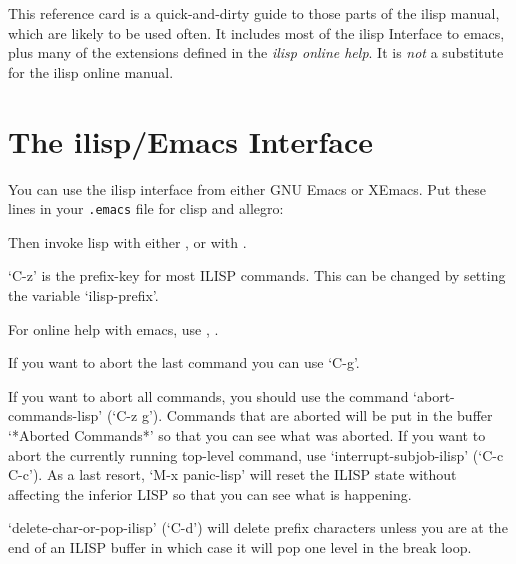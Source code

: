 This reference card is a quick-and-dirty guide to those parts of the
ilisp manual, which are likely to be used often.
It includes most of the ilisp Interface to emacs, plus many of the
extensions defined in the {\it ilisp online help}.  It is {\it not} a
substitute for the ilisp online manual.

\section{The ilisp/Emacs Interface }

You can use the ilisp interface from either GNU Emacs or XEmacs.  
Put these lines in your {\tt .emacs} file for clisp and allegro:


\hskip 25pt 
	 


\hskip 25pt 



\hskip 25pt 


Then invoke lisp with either , 
or with .

`C-z' is the prefix-key for most ILISP commands. This can be changed by 
setting the variable `ilisp-prefix'.

For online help with emacs, use , .


If you want to abort the last command you can use `C-g'.

If you want to abort all commands, you should use the command
`abort-commands-lisp' (`C-z g').  Commands that are aborted will be put
in the buffer `*Aborted Commands*' so that you can see what was
aborted.  If you want to abort the currently running top-level command,
use `interrupt-subjob-ilisp' (`C-c C-c').  As a last resort, `M-x
panic-lisp' will reset the ILISP state without affecting the inferior
LISP so that you can see what is happening.

   `delete-char-or-pop-ilisp' (`C-d') will delete prefix characters
unless you are at the end of an ILISP buffer in which case it will pop
one level in the break loop.

